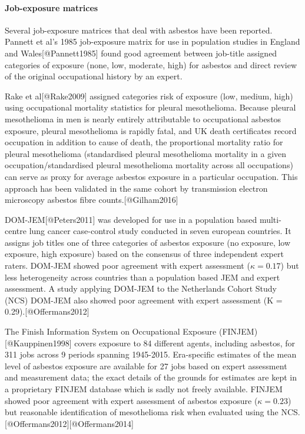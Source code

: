 \documentclass[
]{article}
\begin{document}
\hypertarget{job-exposure-matrices}{%
\paragraph{Job-exposure matrices}\label{job-exposure-matrices}}

Several job-exposure matrices that deal with asbestos have been
reported. Pannett et al's 1985 job-exposure matrix for use in population
studies in England and Wales{[}@Pannett1985{]} found good agreement
between job-title assigned categories of exposure (none, low, moderate,
high) for asbestos and direct review of the original occupational
history by an expert.

Rake et al{[}@Rake2009{]} assigned categories risk of exposure (low,
medium, high) using occupational mortality statistics for pleural
mesothelioma. Because pleural mesothelioma in men is nearly entirely
attributable to occupational asbestos exposure, pleural mesothelioma is
rapidly fatal, and UK death certificates record occupation in addition
to cause of death, the proportional mortality ratio for pleural
mesothelioma (standardised pleural mesothelioma mortality in a given
occupation/standardised pleural mesothelioma mortality across all
occupations) can serve as proxy for average asbestos exposure in a
particular occupation. This approach has been validated in the same
cohort by transmission electron microscopy asbestos fibre
counts.{[}@Gilham2016{]}

DOM-JEM{[}@Peters2011{]} was developed for use in a population based
multi-centre lung cancer case-control study conducted in seven european
countries. It assigns job titles one of three categories of asbestos
exposure (no exposure, low exposure, high exposure) based on the
consensus of three independent expert raters. DOM-JEM showed poor
agreement with expert assessment (\ensuremath{\kappa = 0.17}) but less
heterogeneity across countries than a population based JEM and expert
assessment. A study applying DOM-JEM to the Netherlands Cohort Study
(NCS) DOM-JEM also showed poor agreement with expert assessment (K =
0.29).{[}@Offermans2012{]}

The Finish Information System on Occupational Exposure
(FINJEM){[}@Kauppinen1998{]} covers exposure to 84 different agents,
including asbestos, for 311 jobs across 9 periods spanning 1945-2015.
Era-specific estimates of the mean level of asbestos exposure are
available for 27 jobs based on expert assessment and measurement data;
the exact details of the grounds for estimates are kept in a proprietary
FINJEM database which is sadly not freely available. FINJEM showed poor
agreement with expert assessment of asbestos exposure
(\ensuremath{\kappa = 0.23}) but reasonable identification of
mesothelioma risk when evaluated using the
NCS.{[}@Offermans2012{]}{[}@Offermans2014{]}
\end{document}
